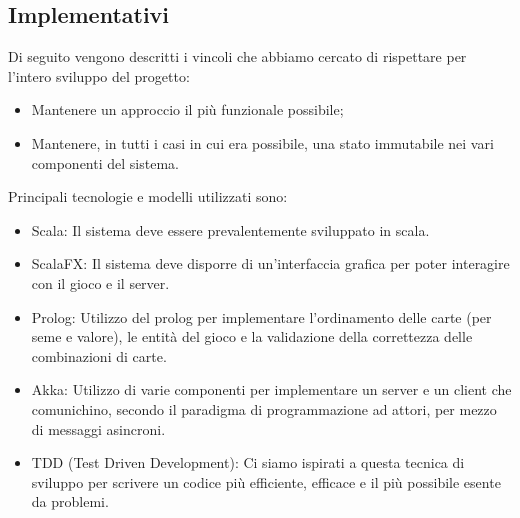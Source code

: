 \subsection{Implementativi}
Di seguito vengono descritti i vincoli che abbiamo cercato di rispettare per l’intero sviluppo del progetto:
\begin{itemize}
    \item Mantenere un approccio il più funzionale possibile;
    \item Mantenere, in tutti i casi in cui era possibile, una stato immutabile nei vari componenti del sistema.
\end{itemize}
Principali tecnologie e modelli utilizzati sono:
\begin{itemize}
    \item Scala: Il sistema deve essere prevalentemente sviluppato in scala.
    \item ScalaFX: Il sistema deve disporre di un’interfaccia grafica per poter interagire con il gioco e il server.
    \item Prolog: Utilizzo del prolog per implementare l’ordinamento delle carte (per seme e valore), le entità del gioco e la validazione della correttezza delle combinazioni di carte.
    \item Akka: Utilizzo di varie componenti per implementare un server e un client che comunichino, secondo il paradigma di programmazione ad attori, per mezzo di messaggi asincroni.
    \item TDD (Test Driven Development): Ci siamo ispirati a questa tecnica di sviluppo per scrivere un codice più efficiente, efficace e il più possibile esente da problemi.
\end{itemize}
\newpage